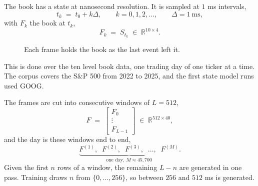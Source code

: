 \documentclass[10pt,a4paper]{article}
\begin{document}
The book has a state at nanosecond resolution. It is sampled at $1$ ms
intervals,
%
\begin{equation}
t_k \;=\; t_0 + k\Delta, \qquad k = 0,1,2,\ldots, \qquad \Delta = 1\ \text{ms},
\label{eq:grid}
\end{equation}
%
with $F_k$ the book at $t_k$,
%
\begin{equation}
F_k \;=\; S_{t_k} \;\in\; \mathbb{R}^{10\times 4}.
\label{eq:ffill}
\end{equation}
%
\begin{figure}[H]
\centering
{}
\caption{Each frame holds the book as the last event left it.}
\label{fig:clock}
\end{figure}

This is done over the ten level book data, one trading day of one ticker at a
time. The corpus covers the S\&P 500 from 2022 to 2025, and the first state
model runs used GOOG.

The frames are cut into consecutive windows of $L=512$,
%
\begin{equation}
F \;=\;
\begin{bmatrix} F_0 \\[1pt] \vdots \\[1pt] F_{L-1} \end{bmatrix}
\;\in\; \mathbb{R}^{512\times 40},
\label{eq:window}
\end{equation}
%
and the day is these windows end to end,
%
\begin{equation}
\underbrace{F^{(1)},\;\; F^{(2)},\;\; F^{(3)},\;\; \ldots,\;\; F^{(M)}}
           _{\text{one day},\ M \approx 45{,}700} .
\label{eq:stream}
\end{equation}
%
Given the first $n$ rows of a window, the remaining $L-n$ are generated in one
pass. Training draws $n$ from $\{0,\ldots,256\}$, so between $256$ and $512$ ms
is generated.
\end{document}
